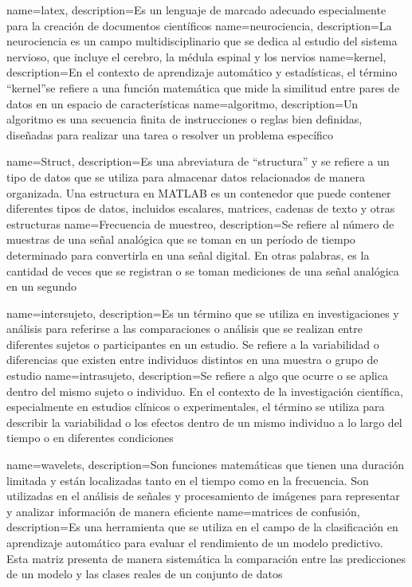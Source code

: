 {
    name=latex,
    description={Es un lenguaje de marcado adecuado especialmente para la creación de documentos científicos}
} 
{
    name=neurociencia,
    description={La neurociencia es un campo multidisciplinario que se dedica al estudio del sistema nervioso, que incluye el cerebro, la médula espinal y los nervios}
}  
{
    name=kernel,
    description={En el contexto de aprendizaje automático y estadísticas, el término ``kernel''se refiere a una función matemática que mide la similitud entre pares de datos en un espacio de características} 
}
{
	name=algoritmo,
	description={Un algoritmo es una secuencia finita de instrucciones o reglas bien definidas, diseñadas para realizar una tarea o resolver un problema específico} 
}

{
	name=Struct,
	description={Es una abreviatura de ``structura'' y se refiere a un tipo de datos que se utiliza para almacenar datos relacionados de manera organizada. Una estructura en MATLAB es un contenedor que puede contener diferentes tipos de datos, incluidos escalares, matrices, cadenas de texto y otras estructuras} 
}
{
	name=Frecuencia de muestreo,
	description={Se refiere al número de muestras de una señal analógica que se toman en un período de tiempo determinado para convertirla en una señal digital. En otras palabras, es la cantidad de veces que se registran o se toman mediciones de una señal analógica en un segundo} 
}

{
	name=intersujeto,
	description={Es un término que se utiliza en investigaciones y análisis para referirse a las comparaciones o análisis que se realizan entre diferentes sujetos o participantes en un estudio. Se refiere a la variabilidad o diferencias que existen entre individuos distintos en una muestra o grupo de estudio} 
}
{
	name=intrasujeto,
	description={Se refiere a algo que ocurre o se aplica dentro del mismo sujeto o individuo. En el contexto de la investigación científica, especialmente en estudios clínicos o experimentales, el término se utiliza para describir la variabilidad o los efectos dentro de un mismo individuo a lo largo del tiempo o en diferentes condiciones} 
}

{
	name=wavelets,
	description={Son funciones matemáticas que tienen una duración limitada y están localizadas tanto en el tiempo como en la frecuencia. Son utilizadas en el análisis de señales y procesamiento de imágenes para representar y analizar información de manera eficiente} 
}
{
	name=matrices de confusión,
	description={Es una herramienta que se utiliza en el campo de la clasificación en aprendizaje automático para evaluar el rendimiento de un modelo predictivo. Esta matriz presenta de manera sistemática la comparación entre las predicciones de un modelo y las clases reales de un conjunto de datos} 
}

